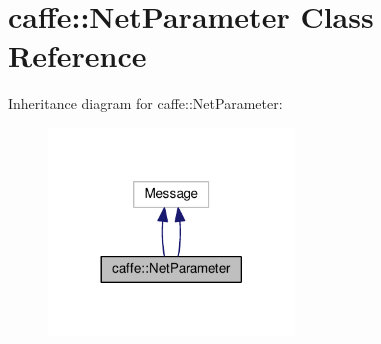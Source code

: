 \hypertarget{classcaffe_1_1_net_parameter}{}\section{caffe\+:\+:Net\+Parameter Class Reference}
\label{classcaffe_1_1_net_parameter}


Inheritance diagram for caffe\+:\+:Net\+Parameter\+:
\nopagebreak
\begin{figure}[H]
\begin{center}
\leavevmode
\includegraphics[width=185pt]{classcaffe_1_1_net_parameter__inherit__graph}
\end{center}
\end{figure}
